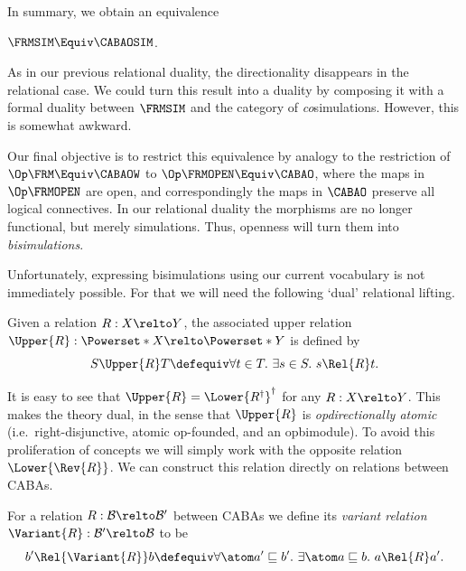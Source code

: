 In summary, we obtain an equivalence

\begin{theorem}
  \label{theorem:rel-thomason}
  $
  \FRMSIM \Equiv \CABAOSIM
  $.
\end{theorem}

As in our previous relational duality, the directionality disappears in the
relational case. We could turn this result into a duality by composing it with a formal
duality between $\FRMSIM$ and the category of \emph{co}simulations. However,
this is somewhat awkward.

Our final objective is to restrict this equivalence by analogy to the
restriction of \(\Op\FRM \Equiv \CABAOW\) to \(\Op\FRMOPEN \Equiv \CABAO\),
where the maps in \(\Op\FRMOPEN\) are open, and correspondingly the maps in
\(\CABAO\) preserve all logical connectives. In our relational duality the
morphisms are no longer functional, but merely simulations. Thus, openness will
turn them into \emph{bisimulations}.

Unfortunately, expressing bisimulations using our current vocabulary is not
immediately possible. For that we will need the following `dual' relational
lifting.

\begin{definition}
  Given a relation \(R : X \relto Y\), the associated upper relation \(\Upper{R}
  : \Powerset*{X} \relto \Powerset*{Y}\) is defined by
  \[
    S \Upper{R} T \defequiv \forall t \in T.\ \exists s \in S.\ s \Rel{R} t.
  \]
\end{definition}
It is easy to see that $\Upper{R} = \Lower{R^\dagger}^\dagger$ for any $R : X \relto Y$.
This makes the theory dual, in the sense that $\Upper{R}$ is
\emph{opdirectionally atomic} (i.e.\ right-disjunctive, atomic op-founded, and an
opbimodule). To avoid this proliferation of concepts we will simply work with
the opposite relation $\Lower{\Rev{R}}$. We can construct this relation directly
on relations between CABAs. 

\begin{definition}
  For a relation \(R : \mathcal{B} \relto \mathcal{B}'\) between CABAs we define
  its \emph{variant relation} \(\Variant{R} : \mathcal{B}' \relto \mathcal{B}\)
  to be
  \[
    b' \Rel{\Variant{R}} b
    \defequiv
      \forall \atom a' \sqsubseteq b'.\
      \exists \atom a \sqsubseteq b.\
      a \Rel{R} a'.
  \]
\end{definition}

